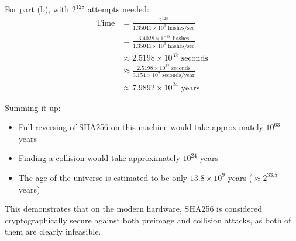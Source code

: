 For part (b), with $2^{128}$ attempts needed:
\begin{align*}
    \text{Time} &= \frac{2^{128}}{1.35041 \times 10^6 \text{ hashes/sec}} \\
    &= \frac{3.4028 \times 10^{38} \text{ hashes}}{1.35041 \times 10^6 \text{ hashes/sec}} \\
    &\approx 2.5198 \times 10^{32} \text{ seconds} \\
    &\approx \frac{2.5198 \times 10^{32} \text{ seconds}}{3.154 \times 10^7 \text{ seconds/year}} \\
    &\approx 7.9892 \times 10^{24} \text{ years}
\end{align*}

Summing it up:
\begin{itemize}
    \item Full reversing of SHA256 on this machine would take approximately $10^{63}$ years
    \item Finding a collision would take approximately $10^{24}$ years
    \item The age of the universe is estimated to be only $13.8 \times 10^9$ years ($\approx 2^{33.5}$ years)
\end{itemize}

This demonstrates that on the modern hardware, SHA256 is considered cryptographically secure against both preimage and collision attacks, as both of them are clearly infeasible.

